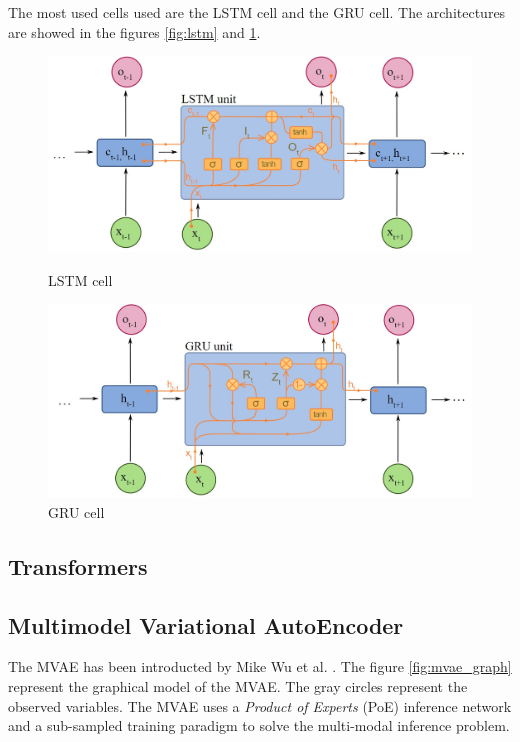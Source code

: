 \documentclass[12pt]{report}
\begin{document}
The most used cells used are the LSTM cell and the GRU cell. The architectures are showed in the figures \ref{fig:lstm} and \ref{fig:gru}.

\begin{figure}[H]
   \begin{minipage}{0.5\textwidth}
     \centering
     \includegraphics[width=.95\linewidth]{images/nn/layers/lstm.jpg}
     \caption{LSTM cell}
     \label{fig:lstm}
   \end{minipage}\hfill
   \begin{minipage}{0.5\textwidth}
     \centering
     \includegraphics[width=.95\linewidth]{images/nn/layers/gru.jpg}
     \caption{GRU cell}
     \label{fig:gru}
   \end{minipage}
\end{figure}


\subsection{Transformers}

\subsection{Multimodel Variational AutoEncoder}

The MVAE has been introducted by Mike Wu et al. \cite{wu_multimodal_2018}.
The figure \ref{fig:mvae_graph} represent the graphical model of the MVAE.
The gray circles represent the observed variables.
The MVAE uses a \textit{Product of Experts} (PoE) inference network and a sub-sampled training paradigm to solve the multi-modal inference problem.
\end{document}
